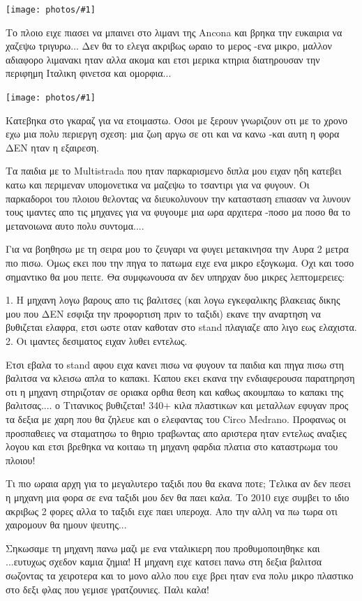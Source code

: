 \documentclass[11pt, letterpaper]{book}
\newcommand\photo[1]{\begin{center}\noindent\texttt{[image: photos/\#1]}\end{center}}
\begin{document}
\photo{6.jpg}

Το πλοιο ειχε πιασει να μπαινει στο λιμανι της Ancona και βρηκα την ευκαιρια να χαζεψω τριγυρω...
Δεν θα το ελεγα ακριβως ωραιο το μερος -ενα μικρο, μαλλον αδιαφορο λιμανακι ηταν αλλα ακομα και ετσι μερικα κτηρια διατηρουσαν την περιφημη Ιταλικη φινετσα και ομορφια...

\photo{7.jpg}

Κατεβηκα στο γκαραζ για να ετοιμαστω. Οσοι με ξερουν γνωριζουν οτι με το χρονο εχω μια πολυ περιεργη σχεση: μια ζωη αργω σε οτι και να κανω -και αυτη η φορα ΔΕΝ ηταν η εξαιρεση.

Τα παιδια με το Multistrada που ηταν παρκαρισμενο διπλα μου ειχαν ηδη κατεβει κατω και περιμεναν υπομονετικα να μαζεψω το τσαντιρι για να φυγουν. Οι παρκαδοροι του πλοιου θελοντας να διευκολυνουν την κατασταση επιασαν να λυνουν τους ιμαντες απο τις μηχανες για να φυγουμε μια ωρα αρχιτερα -ποσο μα ποσο θα το μετανοιωνα αυτο πολυ συντομα....

Για να βοηθησω με τη σειρα μου το ζευγαρι να φυγει μετακινησα την Αυρα 2 μετρα πιο πισω. Ομως εκει που την πηγα το πατωμα ειχε ενα μικρο εξογκωμα. 
Οχι και τοσο σημαντικο θα μου πειτε. Θα συμφωνουσα αν δεν υπηρχαν δυο μικρες λεπτομερειες:

1. Η μηχανη λογω βαρους απο τις βαλιτσες (και λογω εγκεφαλικης βλακειας δικης μου που ΔΕΝ εσφιξα την προφορτιση πριν το ταξιδι) εκανε την αναρτηση να βυθιζεται ελαφρα, ετσι ωστε οταν καθοταν στο stand πλαγιαζε απο λιγο εως ελαχιστα.
2. Οι ιμαντες δεσιματος ειχαν λυθει εντελως.

Ετσι εβαλα το stand αφου ειχα κανει πισω να φυγουν τα παιδια και πηγα πισω στη βαλιτσα να κλεισω απλα το καπακι. Καπου εκει εκανα την ενδιαφερουσα παρατηρηση οτι η μηχανη στηριζοταν σε οριακα ορθια θεση και καθως ακουμπαω το καπακι της βαλιτσας.... ο Τιτανικος βυθιζεται!
340+ κιλα πλαστικων και μεταλλων εφυγαν προς τα δεξια με χαρη που θα ζηλευε και ο ελεφαντας του Circo Medrano. Προφανως οι προσπαθειες να σταματησω το θηριο τραβωντας απο αριστερα ηταν εντελως αναξιες λογου και ετσι βρεθηκα να κοιταω τη μηχανη φαρδια πλατια στο καταστρωμα του πλοιου!

Τι πιο ωραια αρχη για το μεγαλυτερο ταξιδι που θα εκανα ποτε; 
Τελικα αν δεν πεσει η μηχανη μια φορα σε ενα ταξιδι μου δεν θα παει καλα. Το 2010 ειχε συμβει το ιδιο ακριβως 2 φορες αλλα το ταξιδι ειχε παει υπεροχα. Απο την αλλη να πω τωρα οτι χαιρομουν θα ημουν ψευτης...

Σηκωσαμε τη μηχανη πανω μαζι με ενα νταλικιερη που προθυμοποιηθηκε και ...ευτυχως σχεδον καμια ζημια! Η μηχανη ειχε κατσει πανω στη δεξια βαλιτσα σωζοντας τα χειροτερα και το μονο αλλο που ειχε βρει ηταν ενα πολυ μικρο πλαστικο στο δεξι φλας που γεμισε γρατζουνιες. Παλι καλα!
\end{document}
